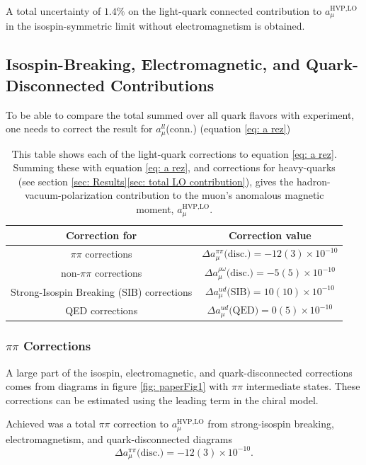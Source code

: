 \documentclass[
a4paper,
10pt,
twoside,
prd,
aps,
nofootinbib,
superscriptaddress,
floatfix,
preprintnumbers,
]{article}
\begin{document}
A total uncertainty of $1.4\%$ on the light-quark connected contribution to $a_\mu^{\text{HVP,LO}}$ in the isospin-symmetric limit without electromagnetism is obtained.

\subsection{Isospin-Breaking, Electromagnetic, and Quark-Disconnected Contributions}
To be able to compare the total summed over all quark flavors with experiment, one needs to correct the result for $a_\mu^{ll}$(conn.) (equation \ref{eq: a rez})

\begin{table}[b]
	\centering
	\begin{tabular}{cc}
		\hline\hline
		Correction for & Correction value \\\hline
		$\pi\pi$ corrections & $\Delta a_\mu^{\pi\pi}\text{(disc.)} = -12(3) \times 10^{-10}$ \\
		non-$\pi\pi$ corrections & $\Delta a_\mu^{\rho\omega} \text{(disc.)} = -5(5)\times 10^{-10}$ \\
		Strong-Isospin Breaking (SIB) corrections & $\Delta a_\mu^{ud} \text{(SIB)} = 10(10) \times 10^{-10}$ \\
		QED corrections & $\Delta a_\mu^{ud}\text{(QED)} = 0(5) \times 10^{-10}$\\\hline\hline
	\end{tabular}
	\captionsetup{width=0.8\linewidth}
	\caption{%
		This table shows each of the light-quark corrections to equation \ref{eq: a rez}.
		Summing these with equation \ref{eq: a rez}, and corrections for heavy-quarks (see section \ref{sec: Results}\ref{sec: total LO contribution}), gives the hadron-vacuum-polarization contribution to the muon's anomalous magnetic moment, $a_\mu^{\text{HVP,LO}}$.
	}
	\label{tab: corrections}
\end{table}

\subsubsection{$\pi\pi$ Corrections}
A large part of the isospin, electromagnetic, and quark-disconnected corrections comes from diagrams in figure \ref{fig: paperFig1} with $\pi\pi$ intermediate states.
These corrections can be estimated using the leading term in the chiral model.

Achieved was a total $\pi\pi$ correction to $a_\mu^{\text{HVP,LO}}$ from strong-isospin breaking, electromagnetism, and quark-disconnected diagrams
\begin{equation}
	\Delta a_\mu^{\pi\pi}\text{(disc.)} = -12(3) \times 10^{-10}.
	\label{eq: pipi}
\end{equation}
\end{document}
